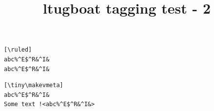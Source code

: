 \documentclass{ltugboat}
\title{ltugboat tagging test - 2}
\begin{document}
\bull

\begin{verbatim}[\ruled]
abc%^E$^R&^I&
abc%^E$^R&^I&
\end{verbatim}

\begin{verbatim}[\tiny\makevmeta]
abc%^E$^R&^I&
Some text !<abc%^E$^R&^I&>
\end{verbatim}
\end{document}
